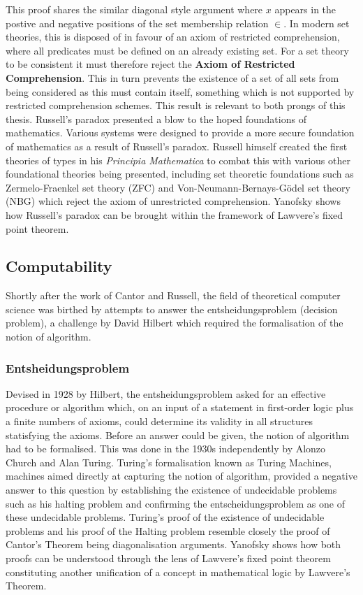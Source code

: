 This proof shares the similar diagonal style argument where $x$ appears in the
postive and negative positions of the set membership relation $\in$. In modern
set theories, this is disposed of in favour of an axiom of restricted
comprehension, where all predicates must be defined on an already existing set.
For a set theory to be consistent it must therefore reject the \textbf{Axiom of
Restricted Comprehension}. This in turn prevents the existence of a set of all
sets from being considered as this must contain itself, something which is not
supported by restricted comprehension schemes. This result is relevant to both
prongs of this thesis. Russell's paradox presented a blow to the hoped
foundations of mathematics. Various systems were designed to provide a more
secure foundation of mathematics as a result of Russell's paradox. Russell
himself created the first theories of types in his \textit{Principia
Mathematica} \cite{russell25} to combat this with various other foundational
theories being presented, including set theoretic foundations such as
Zermelo-Fraenkel set theory (ZFC) and Von-Neumann-Bernays-G{\"o}del set theory
(NBG) which reject the axiom of unrestricted comprehension. Yanofsky
\cite{yanofsky2003universal} shows how Russell's paradox can be brought within
the framework of Lawvere's fixed point theorem.

\subsection{Computability}
Shortly after the work of Cantor and Russell, the field of theoretical computer
science was birthed by attempts to answer the entsheidungsproblem (decision
problem), a challenge by David Hilbert \cite{hilbert1928theoretische} which required the formalisation of the
notion of algorithm.

\subsubsection{Entsheidungsproblem}

Devised in 1928 by Hilbert, the entsheidungsproblem asked for an effective
procedure or algorithm which, on an input of a statement in first-order logic
plus a finite numbers of axioms, could determine its validity in all structures
statisfying the axioms. Before an answer could be given, the notion of algorithm
had to be formalised. This was done in the 1930s independently by Alonzo Church
and Alan Turing. Turing's formalisation
\cite{turing1937computable} known as Turing Machines, machines aimed directly at
capturing the notion of algorithm, provided a negative answer to this question
by establishing the existence of undecidable problems such as his halting
problem and confirming the entscheidungsproblem as one of these undecidable
problems.  Turing's proof of the existence of undecidable problems and his proof
of the Halting problem resemble closely the proof of Cantor's Theorem being
diagonalisation arguments. Yanofsky shows how both proofs can be understood
through the lens of Lawvere's fixed point theorem constituting another
unification of a concept in mathematical logic by Lawvere's Theorem.
